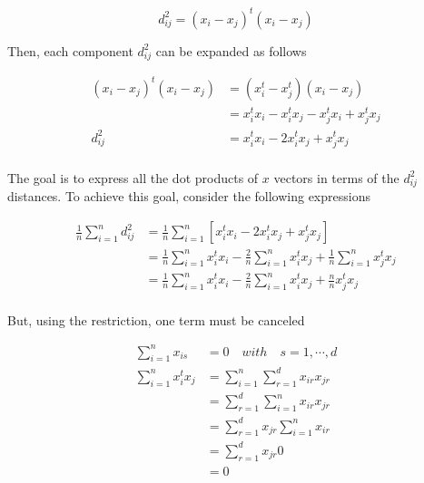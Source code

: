 \documentclass[12pt,journal]{IEEEtran}
\begin{document}
    \begin{equation*}
        d_{ij}^2 = (x_i-x_j)^t (x_i-x_j)
    \end{equation*}

    Then, each component $d_{ij}^2$ can be expanded as follows

    \begin{equation*}
        \begin{aligned}
            (x_i-x_j)^t (x_i-x_j) &= (x_i^t-x_j^t) (x_i-x_j)\\
                                  &= x_i^t x_i - x_i^t x_j - x_j^t x_i + x_j^t x_j\\
                         d_{ij}^2 &= x_i^t x_i - 2 x_i^t x_j + x_j^t x_j\\
        \end{aligned}
    \end{equation*}

    The goal is to express all the dot products of $x$ vectors in terms of the
    $d_{ij}^2$ distances. To achieve this goal, consider the following
    expressions

    \begin{equation*}
        \begin{aligned}
            \frac{1}{n} \sum_{i=1}^n d_{ij}^2 &= \frac{1}{n} \sum_{i=1}^n [x_i^t x_i - 2 x_i^t x_j + x_j^t x_j]\\
            &=  \frac{1}{n} \sum_{i=1}^n x_i^t x_i - \frac{2}{n} \sum_{i=1}^n x_i^t x_j + \frac{1}{n} \sum_{i=1}^n x_j^t x_j\\
            &=  \frac{1}{n} \sum_{i=1}^n x_i^t x_i - \frac{2}{n} \sum_{i=1}^n x_i^t x_j + \frac{n}{n} x_j^t x_j \\
        \end{aligned}
    \end{equation*}

    But, using the restriction, one term must be canceled

    \begin{equation*}
        \begin{aligned}
              \sum_{i=1}^n x_{is} &= 0 \quad with \quad s = 1, \cdots, d\\
            \sum_{i=1}^n x_i^t x_j &= \sum_{i=1}^n \sum_{r=1}^d x_{ir} x_{jr}\\
                                   &= \sum_{r=1}^d \sum_{i=1}^n x_{ir} x_{jr}\\
                                   &= \sum_{r=1}^d x_{jr} \sum_{i=1}^n x_{ir}\\
                                   &= \sum_{r=1}^d x_{jr} 0\\
                                   &= 0\\
        \end{aligned}
    \end{equation*}
\end{document}
